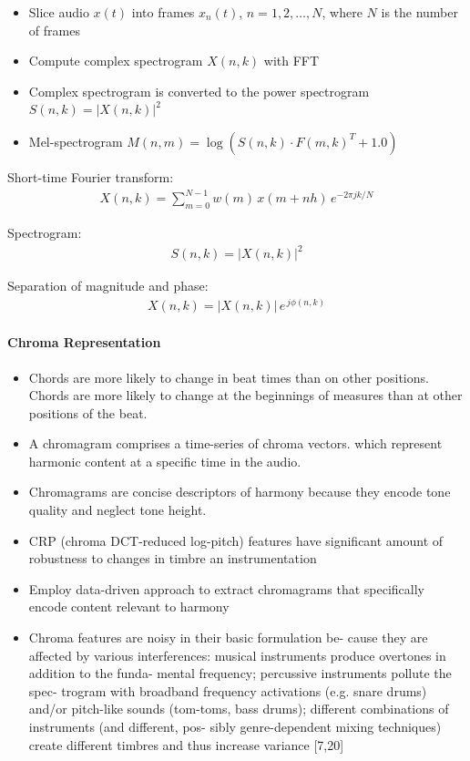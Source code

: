 \documentclass{scrartcl}
\begin{document}
\begin{itemize}
\item Slice audio $x(t)$ into frames $x_n(t)$, $n = 1, 2,\dots, N$, where $N$ is the number of frames
\item Compute complex spectrogram $X(n,k)$ with FFT 
\item Complex spectrogram is converted to the power spectrogram $S(n, k) = |X(n, k)|^2$
\item Mel-spectrogram $M(n,m) = \log \left( S(n,k) \cdot F(m,k)^T + 1.0 \right)$
\end{itemize}
\vspace{1em}

Short-time Fourier transform:
\begin{align}
X(n,k) = \sum_{m = 0}^{N-1} w(m) \, x(m + n  h) \, e^{-2 \pi j  k /N}
\end{align} 

Spectrogram: 
\begin{align}
S(n,k) = |X(n,k)|^2
\end{align} 

Separation of magnitude and phase:
\begin{align} 
X(n,k) = |X(n,k)| \, e^{\, j \phi(n,k)}
\end{align} 


\paragraph{Chroma Representation}

\begin{itemize}
\item Chords are more likely to change in beat times than on other positions. Chords are more likely to change at the beginnings of measures than at other positions of the beat.
\item A chromagram comprises a time-series of chroma vectors. which represent harmonic content at a specific time in the audio.
\item Chromagrams are concise descriptors of harmony because they encode tone quality and neglect tone height.
\item CRP (chroma DCT-reduced log-pitch) features have significant amount of robustness to changes in timbre an instrumentation \cite[Mueller2010]{Mueller2010}
\item Employ data-driven approach to extract chromagrams that specifically encode content relevant to harmony 
\item Chroma features are noisy in their basic formulation be- cause they are affected by various interferences: musical instruments produce overtones in addition to the funda- mental frequency; percussive instruments pollute the spec- trogram with broadband frequency activations (e.g. snare drums) and/or pitch-like sounds (tom-toms, bass drums); different combinations of instruments (and different, pos- sibly genre-dependent mixing techniques) create different timbres and thus increase variance [7,20] \cite{Korzeniowski2016}
\end{itemize}
\end{document}
